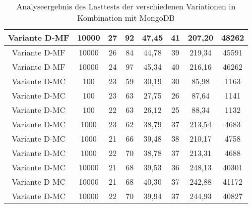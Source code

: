 \begin{landscape}
\begin{table}[h!]
\begin{tabular}{ |c|c|c|c|c|c|c|c|}
		Variante D-MF & 10000 & 27 & 92 & 47,45 & 41 & 207,20 & 48262 \\ 
		\hline
		Variante D-MF & 10000 & 26 & 84 & 44,78 & 39 & 219,34 & 45591 \\ 
		\hline
		Variante D-MF & 10000 & 24 & 97 & 45,34 & 40 & 216,16 & 46262 \\ 
		\hline
		
		Variante D-MC & 100 & 23 & 59 & 30,19 & 30 & 85,98 & 1163 \\ 
		\hline
		Variante D-MC & 100 & 23 & 63 & 27,75 & 26 & 87,64 & 1141 \\ 
		\hline
		Variante D-MC & 100 & 22 & 63 & 26,12 & 25 & 88,34 & 1132 \\ 
		\hline
		
		Variante D-MC & 1000 & 23 & 62 & 38,79 & 37 & 213,54 & 4683 \\ 
		\hline
		Variante D-MC & 1000 & 21 & 66 & 39,48 & 38 & 210,17 & 4758 \\ 
		\hline
		Variante D-MC & 1000 & 22 & 70 & 38,78 & 37 & 213,31 & 4688 \\ 
		\hline
		
		Variante D-MC & 10000 & 21 & 68 & 39,53 & 36 & 248,13 & 40301 \\ 
		\hline
		Variante D-MC & 10000 & 21 & 68 & 40,30 & 37 & 242,88 & 41172 \\ 
		\hline
		Variante D-MC & 10000 & 22 & 70 & 39,94 & 37 & 244,93 & 40827 \\ 
		\hline
	\end{tabular}
	\caption{Analyseergebnis des Lasttests der verschiedenen Variationen in Kombination mit MongoDB}
	\label{fig:performance-mongo}
\end{table}
\end{landscape}

